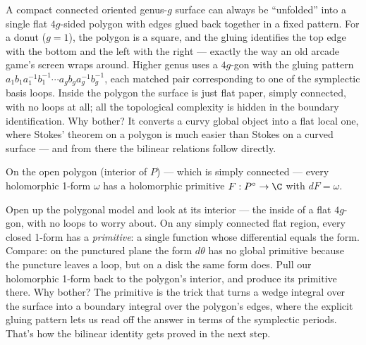 \begin{layman}
A compact connected oriented genus-\(g\) surface can always be
``unfolded'' into a single flat \(4g\)-sided polygon with edges glued
back together in a fixed pattern. For a donut (\(g = 1\)), the polygon
is a square, and the gluing identifies the top edge with the bottom and
the left with the right — exactly the way an old arcade game's screen
wraps around. Higher genus uses a \(4g\)-gon with the gluing pattern
\(a_1 b_1 a_1^{-1} b_1^{-1} \cdots a_g b_g a_g^{-1} b_g^{-1}\), each
matched pair corresponding to one of the symplectic basis loops. Inside
the polygon the surface is just flat paper, simply connected, with no
loops at all; all the topological complexity is hidden in the boundary
identification. Why bother? It converts a curvy global object into a
flat local one, where Stokes' theorem on a polygon is much easier than
Stokes on a curved surface — and from there the bilinear relations
follow directly.
\end{layman}

\begin{lemma}
\label{lem:primitive-on-polygon}
On the open polygon (interior of \(P\)) — which is simply connected —
every holomorphic 1-form \(\omega\) has a holomorphic primitive
\(F:P^{\circ}\to\C\) with \(dF=\omega\).
\notready
\end{lemma}

\begin{layman}
Open up the polygonal model and look at its interior — the inside of a
flat \(4g\)-gon, with no loops to worry about. On any simply connected
flat region, every closed 1-form has a \emph{primitive}: a single
function whose differential equals the form. Compare: on the punctured
plane the form \(d\theta\) has no global primitive because the puncture
leaves a loop, but on a disk the same form does. Pull our holomorphic
1-form back to the polygon's interior, and produce its primitive there.
Why bother? The primitive is the trick that turns a wedge integral
over the surface into a boundary integral over the polygon's edges,
where the explicit gluing pattern lets us read off the answer in terms
of the symplectic periods. That's how the bilinear identity gets proved
in the next step.
\end{layman}

